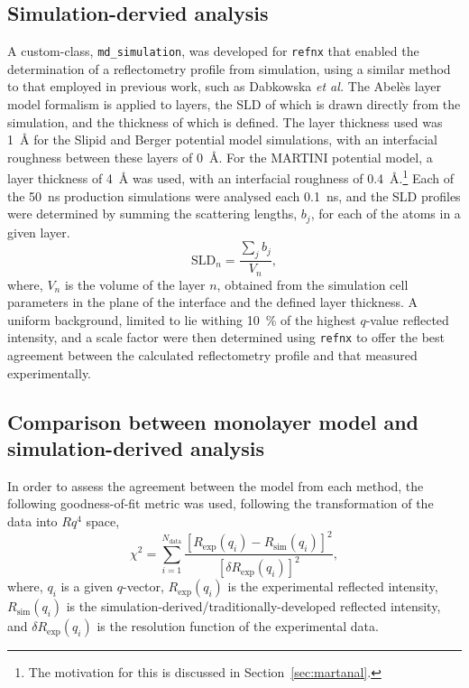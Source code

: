 \subsection{Simulation-dervied analysis}
A custom-class, \texttt{md\_simulation}, was developed for \texttt{refnx}\autocite{nelson_refnx_2019,nelson_refnx_2019-1} that enabled the determination of a reflectometry profile from simulation, using a similar method to that employed in previous work, such as Dabkowska \emph{et al.}\autocite{dabkowska_modulation_2014}
The Abel\`{e}s layer model formalism is applied to layers, the SLD of which is drawn directly from the simulation, and the thickness of which is defined.
The layer thickness used was \SI{1}{\angstrom} for the Slipid and Berger potential model simulations, with an interfacial roughness between these layers of \SI{0}{\angstrom}.
For the MARTINI potential model, a layer thickness of \SI{4}{\angstrom} was used, with an interfacial roughness of \SI{0.4}{\angstrom}.\footnote{The motivation for this is discussed in Section~\ref{sec:martanal}.}
Each of the \SI{50}{\nano\second} production simulations were analysed each \SI{0.1}{\nano\second}, and the SLD profiles were determined by summing the scattering lengths, $b_j$, for each of the atoms in a given layer.
%
\begin{equation}
\text{SLD}_n = \frac{\sum_j b_j}{V_n},
\end{equation}
%
where, $V_n$ is the volume of the layer $n$, obtained from the simulation cell parameters in the plane of the interface and the defined layer thickness.
A uniform background, limited to lie withing \SI{10}{\percent} of the highest $q$-value reflected intensity, and a scale factor were then determined using \texttt{refnx} to offer the best agreement between the calculated reflectometry profile and that measured experimentally.

\subsection{Comparison between monolayer model and simulation-derived analysis}
In order to assess the agreement between the model from each method, the following goodness-of-fit metric was used, following the transformation of the data into $Rq^4$ space,
%
\begin{equation}
\chi^2 = \sum_{i=1}^{N_{\text{data}}}{\frac{[R_{\text{exp}}(q_i) - R_{\text{sim}}(q_i)]^2}{[\delta R_{\text{exp}}(q_i)]^2}},
\end{equation}
%
where, $q_i$ is a given $q$-vector, $R_{\text{exp}}(q_i)$ is the experimental reflected intensity, $R_{\text{sim}}(q_i)$ is the simulation-derived/traditionally-developed reflected intensity, and $\delta R_{\text{exp}}(q_i)$ is the resolution function of the experimental data.

